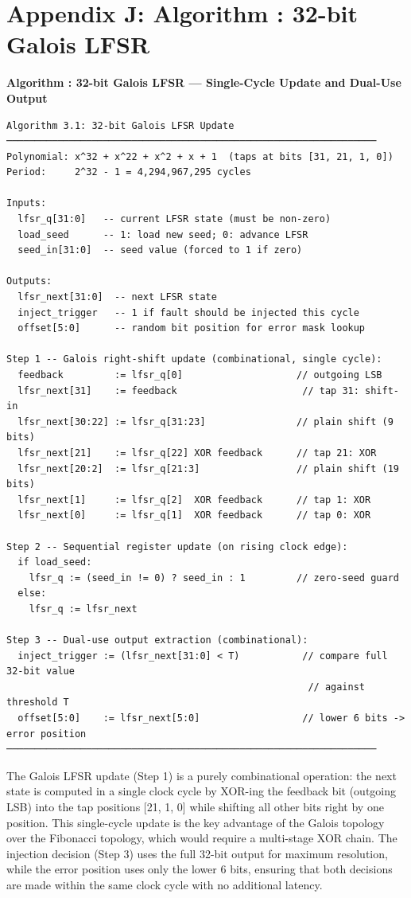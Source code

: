 \documentclass[
  english,
  12pt,
]{report}
\begin{document}
\section{Appendix J: Algorithm : 32-bit Galois
LFSR}\label{appendix-j-algorithm-32-bit-galois-lfsr}

\textbf{Algorithm : 32-bit Galois LFSR --- Single-Cycle Update and
Dual-Use Output}

\begin{verbatim}
Algorithm 3.1: 32-bit Galois LFSR Update
─────────────────────────────────────────────────────────────────
Polynomial: x^32 + x^22 + x^2 + x + 1  (taps at bits [31, 21, 1, 0])
Period:     2^32 - 1 = 4,294,967,295 cycles

Inputs:
  lfsr_q[31:0]   -- current LFSR state (must be non-zero)
  load_seed      -- 1: load new seed; 0: advance LFSR
  seed_in[31:0]  -- seed value (forced to 1 if zero)

Outputs:
  lfsr_next[31:0]  -- next LFSR state
  inject_trigger   -- 1 if fault should be injected this cycle
  offset[5:0]      -- random bit position for error mask lookup

Step 1 -- Galois right-shift update (combinational, single cycle):
  feedback         := lfsr_q[0]                    // outgoing LSB
  lfsr_next[31]    := feedback                      // tap 31: shift-in
  lfsr_next[30:22] := lfsr_q[31:23]                // plain shift (9 bits)
  lfsr_next[21]    := lfsr_q[22] XOR feedback      // tap 21: XOR
  lfsr_next[20:2]  := lfsr_q[21:3]                 // plain shift (19 bits)
  lfsr_next[1]     := lfsr_q[2]  XOR feedback      // tap 1: XOR
  lfsr_next[0]     := lfsr_q[1]  XOR feedback      // tap 0: XOR

Step 2 -- Sequential register update (on rising clock edge):
  if load_seed:
    lfsr_q := (seed_in != 0) ? seed_in : 1         // zero-seed guard
  else:
    lfsr_q := lfsr_next

Step 3 -- Dual-use output extraction (combinational):
  inject_trigger := (lfsr_next[31:0] < T)           // compare full 32-bit value
                                                     // against threshold T
  offset[5:0]    := lfsr_next[5:0]                  // lower 6 bits -> error position
─────────────────────────────────────────────────────────────────
\end{verbatim}

The Galois LFSR update (Step 1) is a purely combinational operation: the
next state is computed in a single clock cycle by XOR-ing the feedback
bit (outgoing LSB) into the tap positions {[}21, 1, 0{]} while shifting
all other bits right by one position. This single-cycle update is the
key advantage of the Galois topology over the Fibonacci topology, which
would require a multi-stage XOR chain. The injection decision (Step 3)
uses the full 32-bit output for maximum resolution, while the error
position uses only the lower 6 bits, ensuring that both decisions are
made within the same clock cycle with no additional latency.
\end{document}

